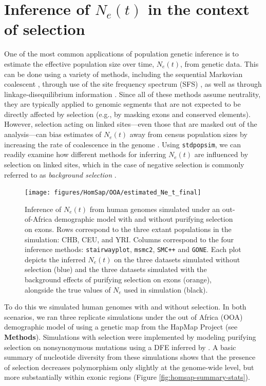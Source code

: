 \documentclass[hidelinks]{article}
\newcommand{\stdpopsim}{\texttt{stdpopsim}\xspace}
\newcommand{\msmc}{\texttt{msmc2}\xspace}
\newcommand{\stairway}{\texttt{stairwayplot}\xspace}
\newcommand{\gone}{\texttt{GONE}\xspace}
\newcommand{\smcpp}{\texttt{SMC++}\xspace}
\begin{document}
    \section*{Inference of $N_e(t)$ in the context of selection}
    One of the most common applications of population genetic inference is to estimate
    the effective population size over time, $N_e(t)$, from genetic data. This can be done
    using a variety of methods, including the sequential Markovian coalescent
    \citep{li2011inference,Schiffels2020,terhorst2017robust},
    through use of the site frequency spectrum (SFS) \citep{liu2020stairway},
    as well as through linkage-disequilibrium information \citep{santiago2020recent}.
    Since all of these methods assume neutrality, they are typically applied to genomic
    segments that are not expected to be directly affected by selection (e.g., by masking exons
    and conserved elements).
    However, selection acting on linked sites---even those that are masked out of the
    analysis---can bias estimates of $N_e(t)$
    away from census population sizes by increasing the
    rate of coalescence in the genome \citep[e.g.][]{schrider2016effects}.
    Using \stdpopsim, we can readily examine how different methods for inferring $N_e(t)$
    are influenced by selection on linked sites,
    which in the case of negative selection is commonly referred to as \emph{background selection}
    \citep{charlesworth1993effect,hudson1995deleterious}.


    \begin{figure}[b!]
        \centering
        \texttt{[image: figures/HomSap/OOA/estimated\_Ne\_t\_final]}
        \caption{
        \label{fig:human-demography}
        Inference of $N_e(t)$ from human genomes simulated under an out-of-Africa demographic model
        with and without purifying selection on exons.
        Rows correspond to the three extant populations in the simulation: CHB, CEU, and YRI.
        Columns correspond to the four inference methods:
        \stairway, \msmc, \smcpp and \gone.
        Each plot depicts the inferred $N_e(t)$ on the three datasets simulated without selection (blue)
        and the three datasets simulated with the background effects of purifying selection on exons (orange),
        alongside the true values of $N_e$ used in simulation (black).
        }
    \end{figure}

    To do this we simulated human genomes with and without selection.
    In both scenarios, we ran three replicate simulations
    under the out of Africa (OOA) demographic model of
    \citet{ragsdale2019models} using a genetic map from the HapMap Project \citep{international2007second} (see \textbf{Methods}).
    Simulations with selection were implemented by modeling purifying selection on nonsynonymous mutations
    using a DFE inferred by \citet{kim2017inference}.
    A basic summary of nucleotide diversity from these simulations
    shows that the presence of selection decreases polymorphism only slightly
    at the genome-wide level, but more substantially within exonic regions (Figure \ref{fig:homsap-summary-stats}). 
    
\end{document}
